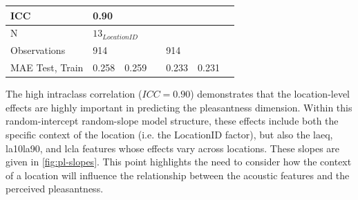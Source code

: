 \begin{table}[ht]
\begin{tabular}{@{}l|lccccc@{}}
    ICC                                      &
    0.90                                     &
    \multicolumn{1}{l}{}                     &
    \multicolumn{1}{l}{}                     &
    \multicolumn{1}{l}{}                     &
    \multicolumn{1}{l}{}                     &
    \multicolumn{1}{l}{}                                                                                                                                                                               \\ \midrule
    N                                        & \multicolumn{6}{l}{$13_{LocationID}$}                                                                                                                   \\
    Observations                             &
    914                                      &
    \multicolumn{1}{l}{}                     &
    \multicolumn{1}{l}{}                     &
    \multicolumn{1}{l}{914}                  &
    \multicolumn{1}{l}{}                     &
    \multicolumn{1}{l}{}                                                                                                                                                                               \\

    MAE Test, Train                          &
    0.258                                    &
    0.259                                    &
                                             &
    \multicolumn{1}{l}{0.233}                &
    0.231                                                                                                                                                                                              \\

    \bottomrule
  \end{tabular}
\end{table}

   The high intraclass correlation ($ICC=0.90$) demonstrates that the location-level effects are highly important in predicting the pleasantness dimension. Within this random-intercept random-slope model structure, these effects include both the specific context of the location (i.e. the LocationID factor), but also the \gls{laeq}, \gls{la10la90}, and \gls{lcla} features whose effects vary across locations. These slopes are given in \cref{fig:pl-slopes}. This point highlights the need to consider how the context of a location will influence the relationship between the acoustic features and the perceived pleasantness.

